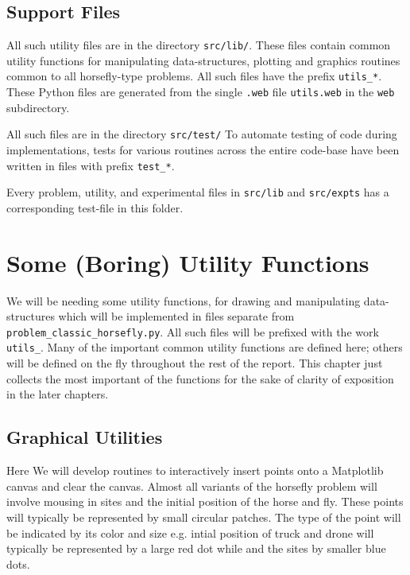 \documentclass[11.5pt]{report}
\begin{document}
\begin{flushleft}
\begin{minipage}{\linewidth}
\begin{list}{}{\setlength{\itemsep}{-\parsep}\setlength{\itemindent}{-\leftmargin}}
\item{}
\end{list}
\end{minipage}\vspace{4ex}
\end{flushleft}
\section{Support Files}

\begin{alphalist}
\item {}  All such utility files are in the directory \texttt{src/lib/}. 
 These files contain common utility functions  for manipulating data-structures, plotting 
 and graphics routines common to all horsefly-type problems. All such files have the prefix 
 \verb|utils_*|. These Python files are generated from the single \verb|.web| file \verb|utils.web| 
 in the \verb|web| subdirectory.

\item {} All such files are in the directory \texttt{src/test/}
 To automate testing of code during implementations, tests for various 
 routines across the entire code-base have been written in files with prefix
 \verb|test_*|.  
 
 Every problem, utility, and experimental files in \verb|src/lib| and \verb|src/expts| 
 has a corresponding test-file in this folder. 
\end{alphalist}\chapter{Some (Boring) Utility Functions}
\label{chap:utility-functions}

We will be needing some utility functions, for drawing and manipulating data-structures 
which will be implemented in files separate from \verb|problem_classic_horsefly.py|.  All such
files will be prefixed with the work \verb|utils_|. Many of the important common utility 
functions are defined here; others will be defined on the fly throughout the rest of the report. 
This chapter just collects the most important of the functions for the sake of clarity of exposition
in the later chapters. 

\section{Graphical Utilities}

Here We will  develop routines to interactively insert points onto a Matplotlib canvas and clear the canvas. 
Almost all variants of the horsefly problem will involve mousing in sites and the initial position of the horse 
and fly. These points will typically be represented by small circular patches. The type of the point
will be indicated by its color and size e.g. intial position of truck and drone 
will typically be represented by a large red dot while and the sites by smaller blue dots. 
\end{document}
